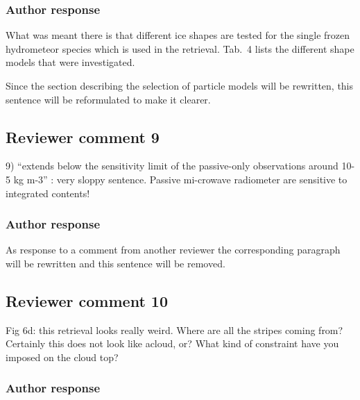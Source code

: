 \documentclass[11pt]{scrartcl}
\begin{document}
\subsubsection*{Author response}

What was meant there is that different ice shapes are tested for the single
frozen hydrometeor species which is used in the retrieval. Tab.~4 lists the
different shape models that were investigated.

Since the section describing the selection of particle models will be rewritten,
this sentence will be reformulated to make it clearer.

\subsection*{Reviewer comment 9}

9) “extends below the sensitivity limit of the passive-only observations around
10-5 kg m-3” : very sloppy sentence. Passive mi-crowave radiometer are sensitive
to integrated contents!

\subsubsection*{Author response}

As response to a comment from another reviewer the corresponding paragraph will be
rewritten and this sentence will be removed.



\subsection*{Reviewer comment 10}

 Fig 6d: this retrieval looks really weird. Where are all the stripes coming
 from? Certainly this does not look like acloud, or? What kind of constraint
 have you imposed on the cloud top?

\subsubsection*{Author response}
\end{document}
